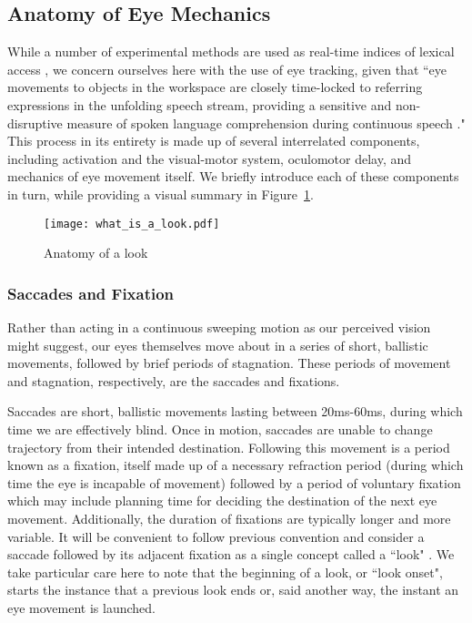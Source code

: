 \subsection{Anatomy of Eye Mechanics}

While a number of experimental methods are used as real-time indices of lexical access \citep{Spivey2005}, we concern ourselves here with the use of eye tracking, given that ``eye movements to objects in the workspace are closely time-locked to referring expressions in the unfolding speech stream, providing a sensitive and non-disruptive measure of spoken language comprehension during continuous speech \citep{allopenna1998tracking}." This process in its entirety is made up of several interrelated components, including activation and the visual-motor system, oculomotor delay, and mechanics of eye movement itself. We briefly introduce each of these components in turn, while providing a visual summary in Figure~\ref{fig:whats_in_a_look}.

\begin{figure}[H]
\centering
\texttt{[image: what\_is\_a\_look.pdf]}
\caption{Anatomy of a look} 
\label{fig:whats_in_a_look}
\end{figure}

\subsubsection{Saccades and Fixation}

Rather than acting in a continuous sweeping motion as our perceived vision might suggest, our eyes themselves move about in a series of short, ballistic movements, followed by brief periods of stagnation. These periods of movement and stagnation, respectively, are the saccades and fixations. 

Saccades are short, ballistic movements lasting between 20ms-60ms, during which time we are effectively blind. Once in motion, saccades are unable to change trajectory from their intended destination. Following this movement is a period known as a fixation, itself made up of a necessary refraction period (during which time the eye is incapable of movement) followed by a period of voluntary fixation which may include planning time for deciding the destination of the next eye movement. Additionally, the duration of fixations are typically longer and more variable. It will be convenient to follow previous convention and consider a saccade followed by its adjacent fixation as a single concept called a ``look" \citep{mcmurray2002look}. We take particular care here to note that the beginning of a look, or ``look onset", starts the instance that a previous look ends or, said another way, the instant an eye movement is launched. 

